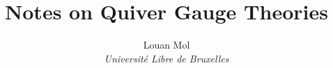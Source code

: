 \documentclass[a4paper,10pt]{article}
\title{\textbf{Notes on Quiver Gauge Theories}}
\author{Louan Mol\\ \textit{Université Libre de Bruxelles}}
\date{}
\begin{document}

  
\pagebreak

\tableofcontents

\pagebreak

\nocite{*}











\pagebreak
\appendix



\pagebreak

\listoftodos

\pagebreak

\printbibliography
\end{document}

